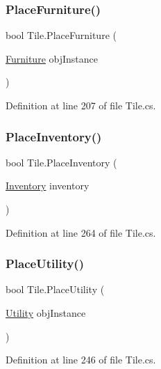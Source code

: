\subsubsection{\texorpdfstring{Place\+Furniture()}{PlaceFurniture()}}
{\footnotesize\ttfamily bool Tile.\+Place\+Furniture (\begin{DoxyParamCaption}\item[{\hyperlink{class_furniture}{Furniture}}]{obj\+Instance }\end{DoxyParamCaption})}



Definition at line 207 of file Tile.\+cs.

\mbox{\label{class_tile_af43b05f2ac39247b4aef063995aa3743}} 
\subsubsection{\texorpdfstring{Place\+Inventory()}{PlaceInventory()}}
{\footnotesize\ttfamily bool Tile.\+Place\+Inventory (\begin{DoxyParamCaption}\item[{\hyperlink{class_inventory}{Inventory}}]{inventory }\end{DoxyParamCaption})}



Definition at line 264 of file Tile.\+cs.

\mbox{\label{class_tile_a10c975f1ca685654ef1d843210f27b47}} 
\subsubsection{\texorpdfstring{Place\+Utility()}{PlaceUtility()}}
{\footnotesize\ttfamily bool Tile.\+Place\+Utility (\begin{DoxyParamCaption}\item[{\hyperlink{class_utility}{Utility}}]{obj\+Instance }\end{DoxyParamCaption})}



Definition at line 246 of file Tile.\+cs.

\mbox{\label{class_tile_a104759fa434ea7c6acc85c81a710a0d9}} 
